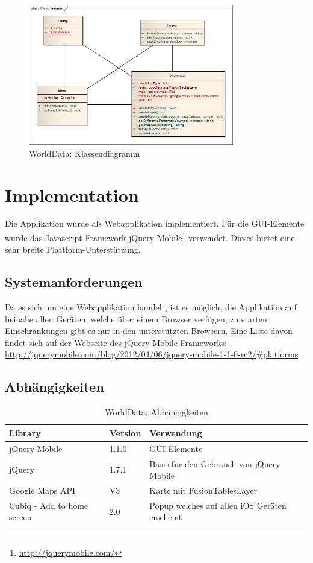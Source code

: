 \begin{figure}[H]
	\centering
	\includegraphics[width=0.8\textwidth]{images/usecase1-worlddata/uml/worlddata-classdiagram}
	\caption{WorldData: Klassendiagramm}
	\label{worlddata-classdiagram}
\end{figure}

\section{Implementation}
Die Applikation wurde als Webapplikation implementiert. Für die GUI-Elemente wurde das Javascript Framework jQuery Mobile\footnote{\url{http://jquerymobile.com/}} verwendet. Dieses bietet eine sehr breite Plattform-Unterstützung.

\subsection{Systemanforderungen}
Da es sich um eine Webapplikation handelt, ist es möglich, die Applikation auf beinahe allen Geräten, welche über einem Browser verfügen, zu starten. Einschränkungen gibt es nur in den unterstützten Browsern. Eine Liste davon findet sich auf der Webseite des jQuery Mobile Frameworks: \url{http://jquerymobile.com/blog/2012/04/06/jquery-mobile-1-1-0-rc2/#platforms}

\subsection{Abhängigkeiten}
\begin{longtable}{|p{0.35\threecelltabwidth}|p{0.11\threecelltabwidth}|p{0.54\threecelltabwidth}|}
\hline 
\textbf{Library} & \textbf{Version} & \textbf{Verwendung} \\ 
\hline 
jQuery Mobile & 1.1.0 & GUI-Elemente \\ 
\hline 
jQuery & 1.7.1 & Basis für den Gebrauch von jQuery Mobile \\ 
\hline 
Google Maps \gls{API} & V3 & Karte mit FusionTablesLayer \\ 
\hline 
Cubiq - Add to home screen & 2.0 & Popup welches auf allen iOS Geräten erscheint \\ 
\hline 
\caption{WorldData: Abhängigkeiten}
\end{longtable} 

